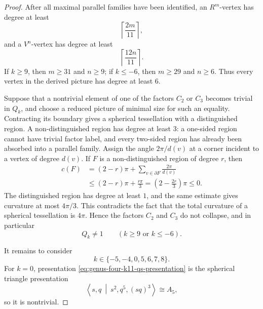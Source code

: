\documentclass{article}
\begin{document}
\begin{proof}
After all maximal parallel families have been identified, an
$R^m$-vertex has degree at least
\[
 \left\lceil\frac{2m}{11}\right\rceil,
\]
and a $V^n$-vertex has degree at least
\[
 \left\lceil\frac{12n}{11}\right\rceil.
\]
If $k\geq9$, then $m\geq31$ and $n\geq9$; if $k\leq-6$, then
$m\geq29$ and $n\geq6$.  Thus every vertex in the derived picture has
degree at least $6$.

Suppose that a nontrivial element of one of the factors $C_2$ or
$C_3$ becomes trivial in $Q_k$, and choose a reduced picture of
minimal size for such an equality.  Contracting its boundary gives a
spherical tessellation with a distinguished region.  A
non-distinguished region has degree at least $3$: a one-sided region
cannot have trivial factor label, and every two-sided region has
already been absorbed into a parallel family.  Assign the angle
$2\pi/d(v)$ at a corner incident to a vertex of degree $d(v)$.  If
$F$ is a non-distinguished region of degree $r$, then
\[
\begin{aligned}
 c(F)
 &=(2-r)\pi+\sum_{v\in\partial F}\frac{2\pi}{d(v)}\\
 &\leq(2-r)\pi+\frac{r\pi}{3}
  =\left(2-\frac{2r}{3}\right)\pi
 \leq0.
\end{aligned}
\]
The distinguished region has degree at least $1$, and the same
estimate gives curvature at most $4\pi/3$.  This contradicts the fact
that the total curvature of a spherical tessellation is $4\pi$.
Hence the factors $C_2$ and $C_3$ do not collapse, and in particular
\[
 Q_k\neq1
 \qquad
 (k\geq9\text{ or }k\leq-6).
\]

It remains to consider
\[
 k\in\{-5,-4,0,5,6,7,8\}.
\]
For $k=0$, presentation
\eqref{eq:genus-four-k11-qs-presentation} is the spherical triangle
presentation
\[
 \left\langle s,q\ \middle|\ s^2,q^5,(sq)^3\right\rangle
 \cong A_5,
\]
so it is nontrivial.


\end{proof}
\end{document}
